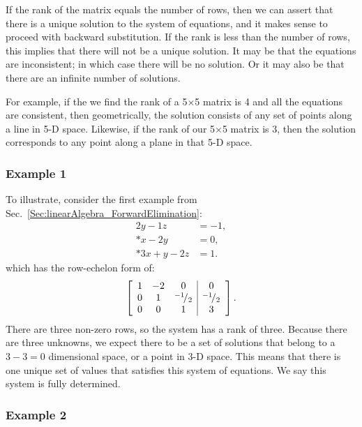 If the rank of the matrix equals the number of rows, then we can assert that there is a unique solution to the system of equations, and it makes sense to proceed with backward substitution. If the rank is less than the number of rows, this implies that there will not be a unique solution. It may be that the equations are inconsistent; in which case there will be no solution. Or it may also be that there are an infinite number of solutions.

For example, if the we find the rank of a 5$\times$5 matrix is 4 and all the equations are consistent, then geometrically, the solution consists of any set of points along a line in 5-D space. Likewise, if the rank of our 5$\times$5 matrix is 3, then the solution corresponds to any point along a plane in that 5-D space.

\subsubsection{Example 1} 

To illustrate, consider the first example from Sec.~\ref{Sec:linearAlgebra_ForwardElimination}:
\begin{align}
  2y - 1z &= -1, \nonumber \\* 
  x - 2y &= 0, \nonumber \\*
  3x + y -2z &= 1. \nonumber
\end{align}
which has the row-echelon form of:
\begin{align}
  \left[ \begin{array}{c c c | c} 
  1 & -2 &  0 &  0 \\
  0 &  1 & {}^{-1}\!/_{2} & {}^{-1}\!/_{2} \\
  0 &  0 &  1 &  3 \\ \end{array} \right] . \nonumber
\end{align}
There are three non-zero rows, so the system has a rank of three. Because there are three unknowns, we expect there to be a set of solutions that belong to a $3 - 3 = 0$ dimensional space, or a point in 3-D space. This means that there is one unique set of values that satisfies this system of equations. We say this system is fully determined.

\subsubsection{Example 2} 

